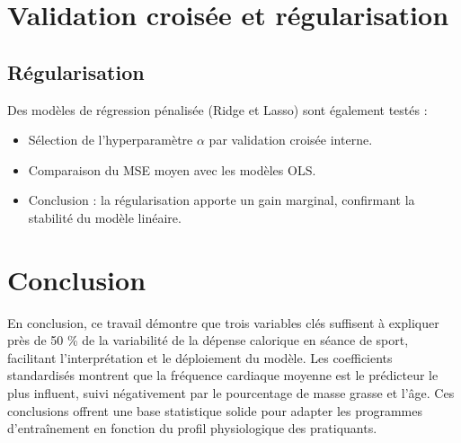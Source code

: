 \documentclass[12pt,a4paper]{article}
\begin{document}
\section{Validation croisée et régularisation}

\subsection{Régularisation}
Des modèles de régression pénalisée (Ridge et Lasso) sont également testés :
\begin{itemize}
  \item Sélection de l’hyperparamètre $\alpha$ par validation croisée interne.
  \item Comparaison du MSE moyen avec les modèles OLS.
  \item Conclusion : la régularisation apporte un gain marginal, confirmant la stabilité du modèle linéaire.
\end{itemize}


\section{Conclusion}
En conclusion, ce travail démontre que trois variables clés suffisent à expliquer près de 50 \% de la variabilité de la dépense calorique en séance de sport, facilitant l’interprétation et le déploiement du modèle. Les coefficients standardisés montrent que la fréquence cardiaque moyenne est le prédicteur le plus influent, suivi négativement par le pourcentage de masse grasse et l’âge. Ces conclusions offrent une base statistique solide pour adapter les programmes d’entraînement en fonction du profil physiologique des pratiquants. 

\newpage
\printbibliography
\end{document}
